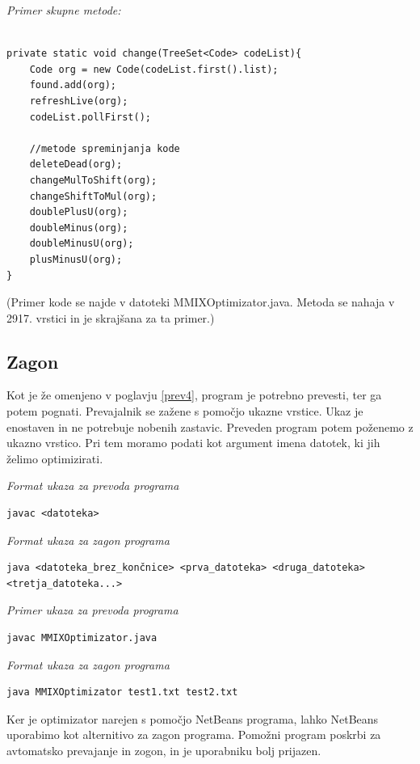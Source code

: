 \documentclass[a4paper, 12pt]{book}
\begin{document}
\noindent
{\it Primer skupne metode:}
\begin{Verbatim}[baselinestretch=1]

private static void change(TreeSet<Code> codeList){
	Code org = new Code(codeList.first().list);
	found.add(org);
	refreshLive(org);
	codeList.pollFirst();

	//metode spreminjanja kode
	deleteDead(org);
	changeMulToShift(org);
	changeShiftToMul(org);
	doublePlusU(org);
	doubleMinus(org);
	doubleMinusU(org);
	plusMinusU(org);
}
\end{Verbatim}
%
\noindent
{\small (Primer kode se najde v datoteki MMIXOptimizator.java. Metoda se nahaja v 2917. vrstici in je skrajšana za ta primer.)}


\subsection{Zagon}

Kot je že omenjeno v poglavju \ref{prev4}, program je potrebno prevesti, ter ga potem pognati. Prevajalnik se zažene s pomočjo ukazne vrstice. Ukaz je enostaven in ne potrebuje nobenih zastavic. Preveden program potem poženemo z ukazno vrstico. Pri tem moramo podati kot argument imena datotek, ki jih želimo optimizirati.

\medskip
	
\noindent
{\it Format ukaza za prevoda programa}
\begin{Verbatim}[baselinestretch=1]
	javac <datoteka>
\end{Verbatim}

\medskip

\noindent
{\it Format ukaza za zagon programa}
\begin{Verbatim}[baselinestretch=1]
java <datoteka_brez_končnice> <prva_datoteka> <druga_datoteka> <tretja_datoteka...>
\end{Verbatim}

\medskip

\noindent
{\it Primer ukaza za prevoda programa}
\begin{Verbatim}[baselinestretch=1]
javac MMIXOptimizator.java
\end{Verbatim}

\medskip

\noindent
{\it Format ukaza za zagon programa}
\begin{Verbatim}[baselinestretch=1]
java MMIXOptimizator test1.txt test2.txt
\end{Verbatim}

Ker je optimizator narejen s pomočjo NetBeans programa, lahko NetBeans uporabimo kot alternitivo za zagon programa. Pomožni program poskrbi za avtomatsko prevajanje in zogon, in je uporabniku bolj prijazen.  
\end{document}
